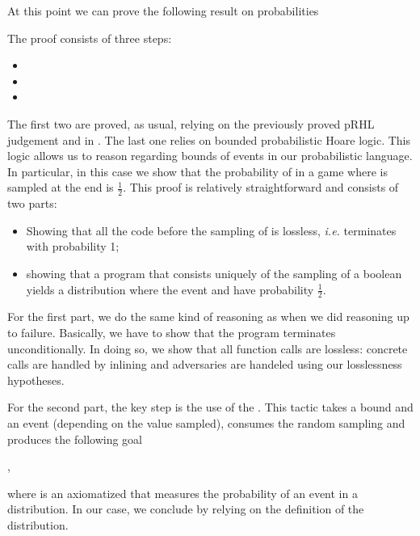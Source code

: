 At this point we can prove the following result on probabilities

The proof consists of three steps:
\begin{itemize}
\item {} 
\item {}
\item {}
\end{itemize}
The first two are proved, as usual, relying on the previously proved
pRHL judgement and in . The last one relies on bounded
probabilistic Hoare logic. This logic allows us to reason regarding
bounds of events in our probabilistic language. In particular, in this
case we show that the probability of  in a game where 
is sampled at the end is $\frac{1}{2}$. This proof is relatively
straightforward and consists of two parts:
\begin{itemize}
\item Showing that all the code before the sampling of  is
  lossless, {\em i.e.} terminates with probability 1;
\item showing that a program that consists uniquely of the sampling of
  a boolean  yields a distribution where the event 
  and  have probability $\frac{1}{2}$.
\end{itemize}

For the first part, we do the same kind of reasoning as when we did
reasoning up to failure. Basically, we have to show that the program
terminates unconditionally. In doing so, we show that all function
calls are lossless: concrete calls are handled by inlining and
adversaries are handeled using our losslessness hypotheses.

For the second part, the key step is the use of the . This tactic takes a bound and an event
(depending on the value sampled), consumes the random sampling and
produces the following goal


,

where  is an axiomatized that measures the probability of an
event in a distribution. In our case, we conclude by relying on the
definition of the  distribution.



